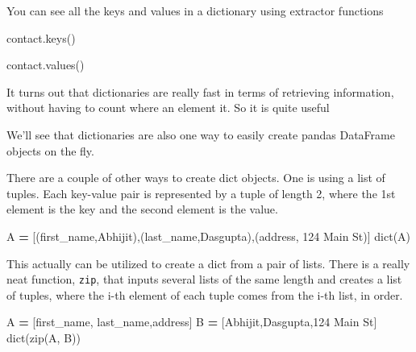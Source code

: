\documentclass[
  letterpaper,
]{scrbook}
\newenvironment{Shaded}{\begin{snugshade}}{\end{snugshade}}
\newcommand{\BuiltInTok}[1]{#1}
\newcommand{\NormalTok}[1]{#1}
\newcommand{\OperatorTok}[1]{\textcolor[rgb]{0.81,0.36,0.00}{\textbf{#1}}}
\newcommand{\StringTok}[1]{\textcolor[rgb]{0.31,0.60,0.02}{#1}}
\begin{document}
You can see all the keys and values in a dictionary using extractor functions

\begin{Shaded}
\begin{Highlighting}[]
\NormalTok{contact.keys()}
\end{Highlighting}
\end{Shaded}

\begin{Shaded}
\begin{Highlighting}[]
\NormalTok{contact.values()}
\end{Highlighting}
\end{Shaded}

It turns out that dictionaries are really fast in terms of retrieving information, without having to count where an element it. So it is quite useful

We'll see that dictionaries are also one way to easily create pandas DataFrame objects on the fly.

There are a couple of other ways to create dict objects. One is using a list of tuples. Each key-value pair is represented by a tuple of length 2, where the 1st element is the key and the second element is the value.

\begin{Shaded}
\begin{Highlighting}[]
\NormalTok{A }\OperatorTok{=}\NormalTok{ [(}\StringTok{\textquotesingle{}first\_name\textquotesingle{}}\NormalTok{,}\StringTok{\textquotesingle{}Abhijit\textquotesingle{}}\NormalTok{),(}\StringTok{\textquotesingle{}last\_name\textquotesingle{}}\NormalTok{,}\StringTok{\textquotesingle{}Dasgupta\textquotesingle{}}\NormalTok{),(}\StringTok{\textquotesingle{}address\textquotesingle{}}\NormalTok{, }\StringTok{\textquotesingle{}124 Main St\textquotesingle{}}\NormalTok{)]}
\BuiltInTok{dict}\NormalTok{(A)}
\end{Highlighting}
\end{Shaded}

This actually can be utilized to create a dict from a pair of lists. There is a really neat function, \texttt{zip}, that inputs several lists of the same length and creates a list of tuples, where the i-th element of each tuple comes from the i-th list, in order.

\begin{Shaded}
\begin{Highlighting}[]
\NormalTok{A }\OperatorTok{=}\NormalTok{ [}\StringTok{\textquotesingle{}first\_name\textquotesingle{}}\NormalTok{, }\StringTok{\textquotesingle{}last\_name\textquotesingle{}}\NormalTok{,}\StringTok{\textquotesingle{}address\textquotesingle{}}\NormalTok{]}
\NormalTok{B }\OperatorTok{=}\NormalTok{ [}\StringTok{\textquotesingle{}Abhijit\textquotesingle{}}\NormalTok{,}\StringTok{\textquotesingle{}Dasgupta\textquotesingle{}}\NormalTok{,}\StringTok{\textquotesingle{}124 Main St\textquotesingle{}}\NormalTok{]}
\BuiltInTok{dict}\NormalTok{(}\BuiltInTok{zip}\NormalTok{(A, B))}
\end{Highlighting}
\end{Shaded}
\end{document}
